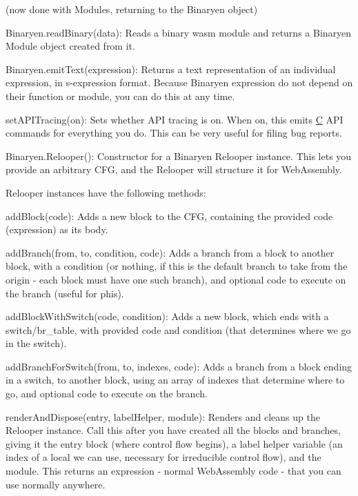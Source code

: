 (now done with {\ttfamily Module}s, returning to the {\ttfamily Binaryen} object)


\begin{DoxyItemize}
\item {\ttfamily Binaryen.\+read\+Binary(data)}\+: Reads a binary wasm module and returns a Binaryen {\ttfamily Module} object created from it.
\item {\ttfamily Binaryen.\+emit\+Text(expression)}\+: Returns a text representation of an individual expression, in s-\/expression format. Because Binaryen expression do not depend on their function or module, you can do this at any time.
\item {\ttfamily set\+A\+P\+I\+Tracing(on)}\+: Sets whether A\+PI tracing is on. When on, this emits \mbox{\hyperlink{struct_c}{C}} A\+PI commands for everything you do. This can be very useful for filing bug reports.
\item {\ttfamily Binaryen.\+Relooper()}\+: Constructor for a Binaryen Relooper instance. This lets you provide an arbitrary C\+FG, and the Relooper will structure it for Web\+Assembly.
\end{DoxyItemize}

Relooper instances have the following methods\+:


\begin{DoxyItemize}
\item {\ttfamily add\+Block(code)}\+: Adds a new block to the C\+FG, containing the provided code (expression) as its body.
\item {\ttfamily add\+Branch(from, to, condition, code)}\+: Adds a branch from a block to another block, with a condition (or nothing, if this is the default branch to take from the origin -\/ each block must have one such branch), and optional code to execute on the branch (useful for phis).
\item {\ttfamily add\+Block\+With\+Switch(code, condition)}\+: Adds a new block, which ends with a switch/br\+\_\+table, with provided code and condition (that determines where we go in the switch).
\item {\ttfamily add\+Branch\+For\+Switch(from, to, indexes, code)}\+: Adds a branch from a block ending in a switch, to another block, using an array of indexes that determine where to go, and optional code to execute on the branch.
\item {\ttfamily render\+And\+Dispose(entry, label\+Helper, module)}\+: Renders and cleans up the Relooper instance. Call this after you have created all the blocks and branches, giving it the entry block (where control flow begins), a label helper variable (an index of a local we can use, necessary for irreducible control flow), and the module. This returns an expression -\/ normal Web\+Assembly code -\/ that you can use normally anywhere. 
\end{DoxyItemize}